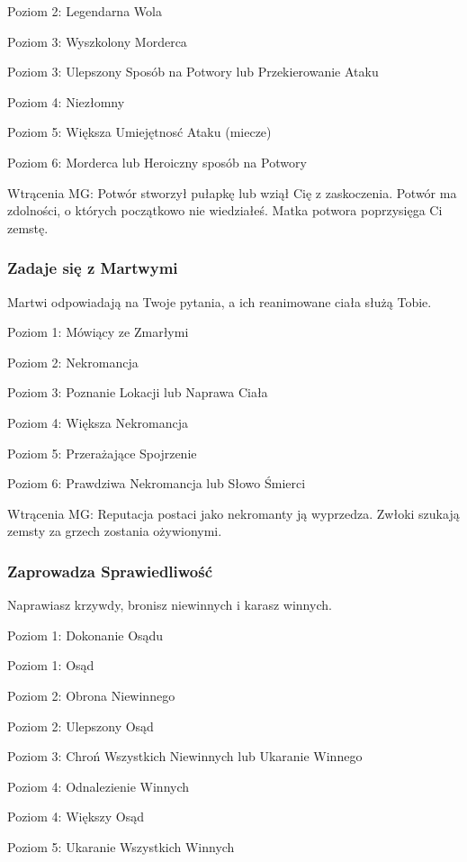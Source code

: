 Poziom 2: Legendarna Wola

Poziom 3: Wyszkolony Morderca

Poziom 3: Ulepszony Sposób na Potwory lub Przekierowanie Ataku

Poziom 4: Niezłomny

Poziom 5: Większa Umiejętnosć Ataku (miecze)

Poziom 6: Morderca lub Heroiczny sposób na Potwory

Wtrącenia MG: Potwór stworzył pułapkę lub wziął Cię z zaskoczenia. Potwór ma zdolności, o których początkowo nie wiedziałeś. Matka potwora poprzysięga Ci zemstę. 

\subsubsection{Zadaje się z Martwymi}

Martwi odpowiadają na Twoje pytania, a ich reanimowane ciała służą Tobie.

Poziom 1: Mówiący ze Zmarłymi

Poziom 2: Nekromancja

Poziom 3: Poznanie Lokacji lub Naprawa Ciała

Poziom 4: Większa Nekromancja

Poziom 5: Przerażające Spojrzenie

Poziom 6: Prawdziwa Nekromancja lub Słowo Śmierci

Wtrącenia MG: Reputacja postaci jako nekromanty ją wyprzedza. Zwłoki szukają zemsty za grzech zostania ożywionymi.

\subsubsection{Zaprowadza Sprawiedliwość}

Naprawiasz krzywdy, bronisz niewinnych i karasz winnych.

Poziom 1: Dokonanie Osądu

Poziom 1: Osąd

Poziom 2: Obrona Niewinnego 

Poziom 2: Ulepszony Osąd

Poziom 3: Chroń Wszystkich Niewinnych lub Ukaranie Winnego

Poziom 4: Odnalezienie Winnych

Poziom 4: Większy Osąd

Poziom 5: Ukaranie Wszystkich Winnych 

